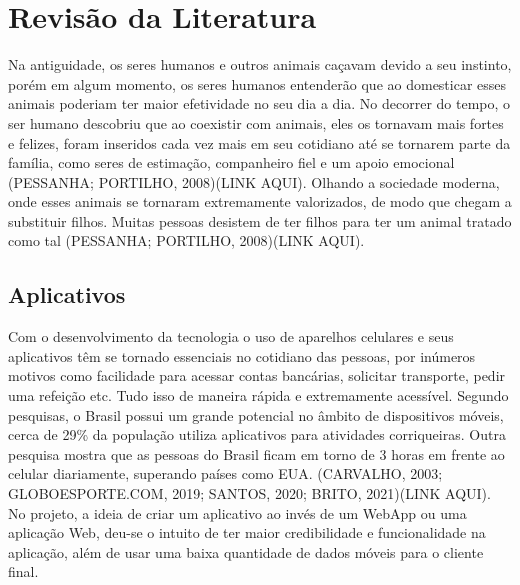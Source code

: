 \chapter{Revisão da Literatura}

Na antiguidade, os seres humanos e outros animais caçavam devido a seu instinto, porém em algum momento, os seres humanos entenderão que ao domesticar esses animais poderiam ter maior efetividade no seu dia a dia. No decorrer do tempo, o ser humano descobriu que ao coexistir com animais, eles os tornavam mais fortes e felizes, foram inseridos cada vez mais em seu cotidiano até se tornarem parte da família, como seres de estimação, companheiro fiel e um apoio emocional (PESSANHA; PORTILHO, 2008)(LINK AQUI).
Olhando a sociedade moderna, onde esses animais se tornaram extremamente valorizados, de modo que chegam a substituir filhos. Muitas pessoas desistem de ter filhos para ter um animal tratado como tal (PESSANHA; PORTILHO, 2008)(LINK AQUI).

\section{Aplicativos}
Com o desenvolvimento da tecnologia o uso de aparelhos celulares e seus aplicativos têm se tornado essenciais no cotidiano das pessoas, por inúmeros motivos como facilidade para acessar contas bancárias, solicitar transporte, pedir uma refeição etc. Tudo isso de maneira rápida e extremamente acessível. Segundo pesquisas, o Brasil possui um grande potencial no âmbito de dispositivos móveis, cerca de 29\% da população utiliza aplicativos para atividades corriqueiras. Outra pesquisa mostra que as pessoas do Brasil ficam em torno de 3 horas em frente ao celular diariamente, superando países como EUA. (CARVALHO, 2003; GLOBOESPORTE.COM, 2019; SANTOS, 2020; BRITO, 2021)(LINK AQUI).\\
No projeto, a ideia de criar um aplicativo ao invés de um WebApp ou uma aplicação Web, deu-se o intuito de ter maior credibilidade e funcionalidade na aplicação, além de usar uma baixa quantidade de dados móveis para o cliente final.


